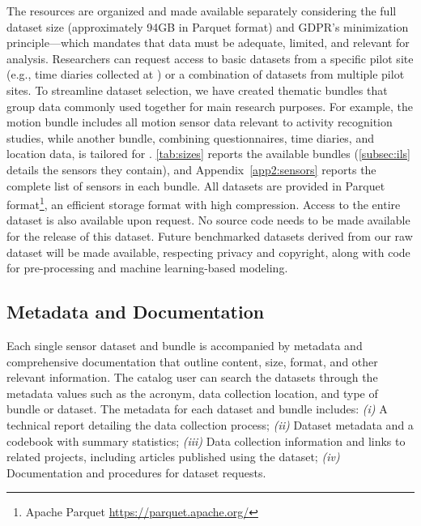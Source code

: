 The resources are organized and made available separately considering the full dataset size (approximately 94GB in Parquet format) and GDPR’s minimization principle—which mandates that data must be adequate, limited, and relevant for analysis. Researchers can request access to basic datasets from a specific pilot site (e.g., time diaries collected at \UNITN) or a combination of datasets from multiple pilot sites. To streamline dataset selection, we have created thematic bundles that group data commonly used together for main research purposes. For example, the motion bundle includes all motion sensor data relevant to activity recognition studies, while another bundle, combining questionnaires, time diaries, and location data, is tailored for .  \cref{tab:sizes} reports the available bundles (\cref{subsec:ils} details the sensors they contain), and Appendix~\ref{app2:sensors} reports the complete list of sensors in each bundle.  All datasets are provided in Parquet format\footnote{Apache Parquet \url{https://parquet.apache.org/}}, an efficient storage format with high compression.
Access to the entire \dataset dataset is also available upon request. 
No source code needs to be made available for the release of this dataset. Future benchmarked datasets derived from our raw dataset will be made available, respecting privacy and copyright, along with code for pre-processing and machine learning-based modeling.

\subsection{Metadata and Documentation}
Each single sensor dataset and bundle is accompanied by metadata and comprehensive documentation that outline content, size, format, and other relevant information.
The catalog user can search the datasets through the metadata values such as the acronym, data collection location, and type of bundle or dataset. The metadata for each dataset and bundle includes:
%
    \textit{(i)} A technical report detailing the data collection process;
    \textit{(ii)} Dataset metadata and a codebook with summary statistics;
    \textit{(iii)} Data collection information and links to related projects, including articles published using the dataset;
    \textit{(iv)} Documentation and procedures for dataset requests.

